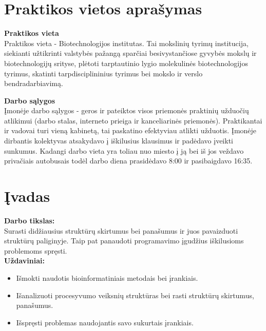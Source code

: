 \documentclass[a4paper,12pt]{article}
\begin{document}
\clearpage
\null
\thispagestyle{empty}%
\addtocounter{page}{-1}%





\tableofcontents

\clearpage
\normalsize


\section*{Praktikos vietos aprašymas}
\vspace{3cm}
\textbf{\large{Praktikos vieta}}\\
 Praktikos vieta - Biotechnologijos institutas. Tai mokslinių tyrimų institucija, siekianti užtikrinti valstybės pažangą sparčiai besivystančiose gyvybės mokslų ir biotechnologijų srityse, plėtoti tarptautinio lygio molekulinės biotechnologijos tyrimus, skatinti tarpdisciplininius tyrimus bei mokslo ir verslo bendradarbiavimą.
 
 \vspace{3cm}
\textbf{\large{Darbo sąlygos}}\\
 Įmonėje darbo sąlygos - geros ir pateiktos visos priemonės praktinių užduočių atlikimui (darbo stalas, interneto prieiga ir kanceliarinės priemonės). Praktikantai ir vadovai turi vieną kabinetą, tai paskatino efektyviau atlikti užduotis. Įmonėje dirbantis kolektyvas atsakydavo į iškilusius klausimus ir padėdavo įveikti sunkumus. Kadangi darbo vieta yra toliau nuo miesto į ją bei iš jos veždavo  privačiais autobusais todėl darbo diena prasidėdavo 8:00 ir pasibaigdavo 16:35.
\vspace{1cm}

\clearpage

\section*{Įvadas}

\textbf{Darbo tikslas:} \\
Surasti didžiausius struktūrų skirtumus bei panašumus ir juos pavaizduoti struktūrų paliginyje.
Taip pat panaudoti programavimo įgudžius iškilusioms problemoms spręsti.\\

\textbf{Uždaviniai:} \\
\begin{itemize}
	\item Išmokti naudotis bioinformatiniais metodais bei įrankiais.
	\item Išanalizuoti procesyvumo veiksnių struktūras bei rasti struktūrų skirtumus, panašumus.
	\item Išspręsti problemas naudojantis savo sukurtais įrankiais.
\end{itemize}
\hfill
\end{document}
